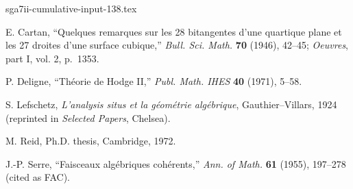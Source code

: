 \begin{filecontents*}{sga7ii-cumulative-input-138.tex}
\begin{enumerate}[label={[\arabic*]}]
\item E. Cartan, ``Quelques remarques sur les 28 bitangentes d'une quartique
  plane et les 27 droites d'une surface cubique,'' \emph{Bull. Sci. Math.}
  \textbf{70} (1946), 42--45; \emph{Oeuvres}, part I, vol. 2, p.~1353.
\item P. Deligne, ``Th\'eorie de Hodge II,'' \emph{Publ. Math. IHES}
  \textbf{40} (1971), 5--58.
\item S. Lefschetz, \emph{L'analysis situs et la g\'eom\'etrie alg\'ebrique},
  Gauthier--Villars, 1924 (reprinted in \emph{Selected Papers}, Chelsea).
\item M. Reid, Ph.D. thesis, Cambridge, 1972.
\item J.-P. Serre, ``Faisceaux alg\'ebriques coh\'erents,''
  \emph{Ann. of Math.} \textbf{61} (1955), 197--278 (cited as FAC).
\end{enumerate}
\end{filecontents*}

